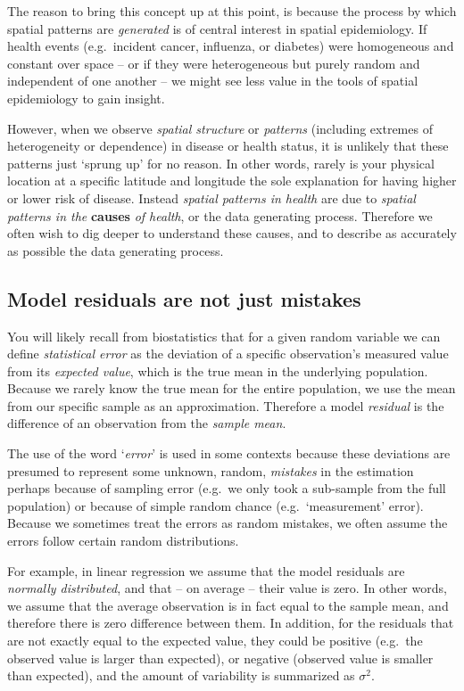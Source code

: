 \documentclass[
]{book}
\begin{document}
The reason to bring this concept up at this point, is because the process by which spatial patterns are \emph{generated} is of central interest in spatial epidemiology. If health events (e.g.~incident cancer, influenza, or diabetes) were homogeneous and constant over space -- or if they were heterogeneous but purely random and independent of one another -- we might see less value in the tools of spatial epidemiology to gain insight.

However, when we observe \emph{spatial structure} or \emph{patterns} (including extremes of heterogeneity or dependence) in disease or health status, it is unlikely that these patterns just `sprung up' for no reason. In other words, rarely is your physical location at a specific latitude and longitude the sole explanation for having higher or lower risk of disease. Instead \emph{spatial patterns in health} are due to \emph{spatial patterns in the} \textbf{causes} \emph{of health}, or the data generating process. Therefore we often wish to dig deeper to understand these causes, and to describe as accurately as possible the data generating process.

\hypertarget{model-residuals-are-not-just-mistakes}{%
\subsection{Model residuals are not just mistakes}\label{model-residuals-are-not-just-mistakes}}

You will likely recall from biostatistics that for a given random variable we can define \emph{statistical error} as the deviation of a specific observation's measured value from its \emph{expected value}, which is the true mean in the underlying population. Because we rarely know the true mean for the entire population, we use the mean from our specific sample as an approximation. Therefore a model \emph{residual} is the difference of an observation from the \emph{sample mean}.

The use of the word `\emph{error}' is used in some contexts because these deviations are presumed to represent some unknown, random, \emph{mistakes} in the estimation perhaps because of sampling error (e.g.~we only took a sub-sample from the full population) or because of simple random chance (e.g.~`measurement' error). Because we sometimes treat the errors as random mistakes, we often assume the errors follow certain random distributions.

For example, in linear regression we assume that the model residuals are \emph{normally distributed}, and that -- on average -- their value is zero. In other words, we assume that the average observation is in fact equal to the sample mean, and therefore there is zero difference between them. In addition, for the residuals that are not exactly equal to the expected value, they could be positive (e.g.~the observed value is larger than expected), or negative (observed value is smaller than expected), and the amount of variability is summarized as \(\sigma^2\).
\end{document}
